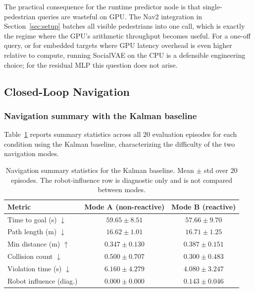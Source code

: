 \documentclass[12pt, a4paper]{article}
\begin{document}
The practical consequence for the runtime predictor node is that single-pedestrian queries are wasteful on GPU. The Nav2 integration in Section~\ref{sec:setup} batches all visible pedestrians into one call, which is exactly the regime where the GPU's arithmetic throughput becomes useful. For a one-off query, or for embedded targets where GPU latency overhead is even higher relative to compute, running SocialVAE on the CPU is a defensible engineering choice; for the residual MLP this question does not arise.

\subsection{Closed-Loop Navigation}
\label{sec:res-nav}

\subsubsection*{Navigation summary with the Kalman baseline}

Table~\ref{tab:nav_summary} reports summary statistics across all $20$ evaluation episodes for each condition using the Kalman baseline, characterizing the difficulty of the two navigation modes.

\begin{table}[H]
\centering
\caption{Navigation summary statistics for the Kalman baseline. Mean $\pm$ std over $20$ episodes. The robot-influence row is diagnostic only and is not compared between modes.}
\label{tab:nav_summary}
\begin{tabular}{lcc}
\toprule
\textbf{Metric} & \textbf{Mode A (non-reactive)} & \textbf{Mode B (reactive)} \\
\midrule
Time to goal (s) $\downarrow$ & $59.65 \pm 8.51$ & $\mathbf{57.66 \pm 9.70}$ \\
Path length (m) $\downarrow$ & $\mathbf{16.62 \pm 1.01}$ & $16.71 \pm 1.25$ \\
Min distance (m) $\uparrow$ & $0.347 \pm 0.130$ & $\mathbf{0.387 \pm 0.151}$ \\
Collision count $\downarrow$ & $0.500 \pm 0.707$ & $\mathbf{0.300 \pm 0.483}$ \\
Violation time (s) $\downarrow$ & $6.160 \pm 4.279$ & $\mathbf{4.080 \pm 3.247}$ \\
Robot influence (diag.) & $0.000 \pm 0.000$ & $0.143 \pm 0.046$ \\
\bottomrule
\end{tabular}
\end{table}
\end{document}
